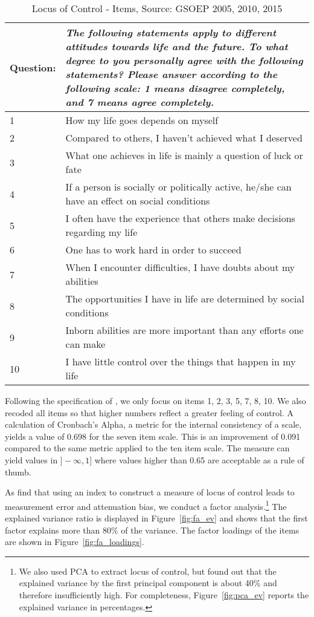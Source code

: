 \documentclass[12pt, a4paper, fleqn, parskip]{scrartcl}
\begin{document}
\begin{table}[H]
	\begin{tabular}{p{1.5cm} p{14cm}}
	\toprule
	Question: & \textit{The following statements apply to different attitudes
	towards life and the future. To what degree to you personally agree with
	the following statements? Please answer according to the following scale: 1
	means disagree completely, and 7 means agree completely.} \\
	\midrule
	1  & How my life goes depends on myself \\
	2  & Compared to others, I haven't achieved what I deserved \\
	3  & What one achieves in life is mainly a question of luck or fate \\
	4  & If a person is socially or politically active, he/she can have an effect on social conditions \\
	5  & I often have the experience that others make decisions regarding my life \\
	6  & One has to work hard in order to succeed \\
	7  & When I encounter difficulties, I have doubts about my abilities \\
	8  & The opportunities I have in life are determined by social conditions \\
	9  & Inborn abilities are more important than any efforts one can make \\
	10 & I have little control over the things that happen in my life \\
	\bottomrule
	\end{tabular}
	\caption{Locus of Control - Items, Source: GSOEP 2005, 2010, 2015}
	\label{tab:loc_items}
\end{table}

Following the specification of \citet{specht2013}, we only focus on items 1, 2,
3, 5, 7, 8, 10. We also recoded all items so that higher numbers reflect a
greater feeling of control. A calculation of Cronbach's Alpha, a metric for the
internal consistency of a scale, yields a value of 0.698 for the seven item
scale. This is an improvement of 0.091 compared to the same metric applied to
the ten item scale. The measure can yield values in $]-\infty, 1]$ where values
higher than 0.65 are acceptable as a rule of thumb.

As \citet{piatek2016} find that using an index to construct a measure of locus
of control leads to measurement error and attenuation bias, we conduct a factor
analysis.\footnote{We also used PCA to extract locus of control, but found out
that the explained variance by the first principal component is about 40\% and
therefore insufficiently high. For completeness, Figure~\ref{fig:pca_ev}
reports the explained variance in percentages.} The explained variance ratio is
displayed in Figure~\ref{fig:fa_ev} and shows that the first factor explains
more than 80\% of the variance. The factor loadings of the items are shown in
Figure~\ref{fig:fa_loadings}.
\end{document}
